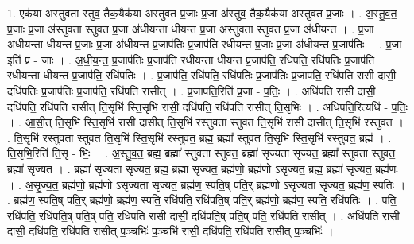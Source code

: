 \documentclass[17pt]{extarticle}
\begin{document}
1. एक॑या अस्तुवता स्तुव॒ तैक॒यैक॑या अस्तुवत प्र॒जाः प्र॒जा अ॑स्तुव॒ तैक॒यैक॑या अस्तुवत प्र॒जाः । . अ॒स्तु॒व॒त॒ प्र॒जाः प्र॒जा अ॑स्तुवता स्तुवत प्र॒जा अ॑धीयन्ता धीयन्त प्र॒जा अ॑स्तुवता स्तुवत प्र॒जा अ॑धीयन्त । . प्र॒जा अ॑धीयन्ता धीयन्त प्र॒जाः प्र॒जा अ॑धीयन्त प्र॒जाप॑तिः प्र॒जाप॑ति रधीयन्त प्र॒जाः प्र॒जा अ॑धीयन्त प्र॒जाप॑तिः । . प्र॒जा इति॑ प्र - जाः । . अ॒धी॒य॒न्त॒ प्र॒जाप॑तिः प्र॒जाप॑ति रधीयन्ता धीयन्त प्र॒जाप॑ति॒ रधि॑पति॒ रधि॑पतिः प्र॒जाप॑ति रधीयन्ता धीयन्त प्र॒जाप॑ति॒ रधि॑पतिः । . प्र॒जाप॑ति॒ रधि॑पति॒ रधि॑पतिः प्र॒जाप॑तिः प्र॒जाप॑ति॒ रधि॑पति रासी दासी॒ दधि॑पतिः प्र॒जाप॑तिः प्र॒जाप॑ति॒ रधि॑पति रासीत् । . प्र॒जाप॑ति॒रिति॑ प्र॒जा - प॒तिः॒ । . अधि॑पति रासी दासी॒ दधि॑पति॒ रधि॑पति रासीत् ति॒सृभि॑ स्ति॒सृभि॑ रासी॒ दधि॑पति॒ रधि॑पति रासीत् ति॒सृभिः॑ । . अधि॑पति॒रित्यधि॑ - प॒तिः॒ । . आ॒सी॒त् ति॒सृभि॑ स्ति॒सृभि॑ रासी दासीत् ति॒सृभि॑ रस्तुवता स्तुवत ति॒सृभि॑ रासी दासीत् ति॒सृभि॑ रस्तुवत । . ति॒सृभि॑ रस्तुवता स्तुवत ति॒सृभि॑ स्ति॒सृभि॑ रस्तुवत॒ ब्रह्म॒ ब्रह्मा᳚ स्तुवत ति॒सृभि॑ स्ति॒सृभि॑ रस्तुवत॒ ब्रह्म॑ । . ति॒सृभि॒रिति॑ ति॒सृ - भिः॒ । . अ॒स्तु॒व॒त॒ ब्रह्म॒ ब्रह्मा᳚ स्तुवता स्तुवत॒ ब्रह्मा॑ सृज्यता सृज्यत॒ ब्रह्मा᳚ स्तुवता स्तुवत॒ ब्रह्मा॑ सृज्यत । . ब्रह्मा॑ सृज्यता सृज्यत॒ ब्रह्म॒ ब्रह्मा॑ सृज्यत॒ ब्रह्म॑णो॒ ब्रह्म॑णो ऽसृज्यत॒ ब्रह्म॒ ब्रह्मा॑ सृज्यत॒ ब्रह्म॑णः । . अ॒सृ॒ज्य॒त॒ ब्रह्म॑णो॒ ब्रह्म॑णो ऽसृज्यता सृज्यत॒ ब्रह्म॑ण॒ स्पति॒ष् पति॒र् ब्रह्म॑णो ऽसृज्यता सृज्यत॒ ब्रह्म॑ण॒ स्पतिः॑ । . ब्रह्म॑ण॒ स्पति॒ष् पति॒र् ब्रह्म॑णो॒ ब्रह्म॑ण॒ स्पति॒ रधि॑पति॒ रधि॑पति॒ष् पति॒र् ब्रह्म॑णो॒ ब्रह्म॑ण॒ स्पति॒ रधि॑पतिः । . पति॒ रधि॑पति॒ रधि॑पति॒ष् पति॒ष् पति॒ रधि॑पति रासी दासी॒ दधि॑पति॒ष् पति॒ष् पति॒ रधि॑पति रासीत् । . अधि॑पति रासी दासी॒ दधि॑पति॒ रधि॑पति रासीत् प॒ञ्चभिः॑ प॒ञ्चभि॑ रासी॒ दधि॑पति॒ रधि॑पति रासीत् प॒ञ्चभिः॑ । \newline
\end{document}
